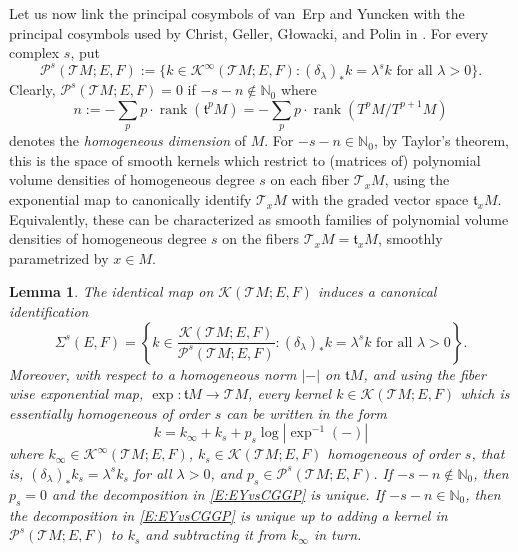 \documentclass[reqno,12pt]{amsart}
\DeclareMathOperator{\rank}{rank}
\theoremstyle{plain}
\newtheorem{lemma}[theorem]{Lemma}
\theoremstyle{definition}
\begin{document}
Let us now link the principal cosymbols of van~Erp and Yuncken with the principal cosymbols used by Christ, Geller, G{\l}owacki, and Polin in \cite{CGGP92}.
For every complex $s$, put 
$$
\mathcal P^s(\mathcal TM;E,F):=\bigl\{k\in\mathcal K^\infty(\mathcal TM;E,F):\textrm{$(\delta_\lambda)_*k=\lambda^sk$ for all $\lambda>0$}\bigr\}.
$$ 
Clearly, $\mathcal P^s(\mathcal TM;E,F)=0$ if $-s-n\notin\mathbb N_0$ where 
\begin{equation}\label{E:hdim}
n:=-\sum_pp\cdot\rank(\mathfrak t^pM)=-\sum_pp\cdot\rank(T^pM/T^{p+1}M)
\end{equation} 
denotes the \emph{homogeneous dimension} of $M$.
For $-s-n\in\mathbb N_0$, by Taylor's theorem, this is the space of smooth kernels which restrict to (matrices of) polynomial volume densities of homogeneous degree $s$ on each fiber $\mathcal T_xM$, using the exponential map to canonically identify $\mathcal T_xM$ with the graded vector space $\mathfrak t_xM$.
Equivalently, these can be characterized as smooth families of polynomial volume densities of homogeneous degree $s$ on the fibers $\mathcal T_xM=\mathfrak t_xM$, smoothly parametrized by $x\in M$.


\begin{lemma}\label{L:EYvsCGGP}
The identical map on $\mathcal K(\mathcal TM;E,F)$ induces a canonical identification
$$
\Sigma^s(E,F)=\left\{k\in\frac{\mathcal K(\mathcal TM;E,F)}{\mathcal P^s(\mathcal TM;E,F)}:\text{$(\delta_\lambda)_*k=\lambda^sk$ for all $\lambda>0$}\right\}.
$$
Moreover, with respect to a homogeneous norm $|-|$ on $\mathfrak tM$, and using the fiber wise exponential map, $\exp\colon\mathfrak tM\to\mathcal TM$,
every kernel $k\in\mathcal K(\mathcal TM;E,F)$ which is essentially homogeneous of order $s$ can be written in the form
\begin{equation}\label{E:EYvsCGGP}
k=k_\infty+k_s+p_s\log|\exp^{-1}(-)|
\end{equation}
where $k_\infty\in\mathcal K^\infty(\mathcal TM;E,F)$, $k_s\in\mathcal K(\mathcal TM;E,F)$ homogeneous of order $s$, that is, $(\delta_\lambda)_*k_s=\lambda^sk_s$ for all $\lambda>0$, and $p_s\in\mathcal P^s(\mathcal TM;E,F)$.
If $-s-n\notin\mathbb N_0$, then $p_s=0$ and the decomposition in \eqref{E:EYvsCGGP} is unique.
If $-s-n\in\mathbb N_0$, then the decomposition in \eqref{E:EYvsCGGP} is unique up to adding a kernel in $\mathcal P^s(\mathcal TM;E,F)$ to $k_s$ and subtracting it from $k_\infty$ in turn.
\end{lemma}
\end{document}
